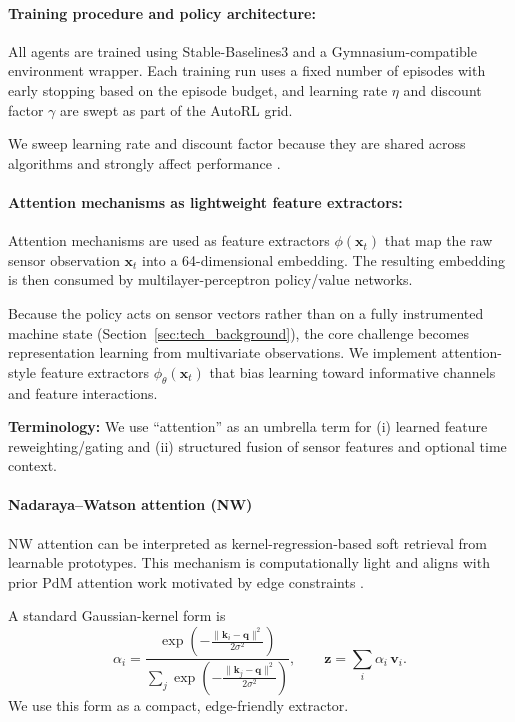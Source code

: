 \documentclass[sn-basic]{sn-jnl} %
\begin{document}
\paragraph{Training procedure and policy architecture:}
All agents are trained using Stable-Baselines3 and a Gymnasium-compatible environment wrapper. Each training run uses a fixed number of episodes with early stopping based on the episode budget, and learning rate $\eta$ and discount factor $\gamma$ are swept as part of the AutoRL grid.

We sweep learning rate and discount factor because they are shared across algorithms and strongly affect performance \cite{Henderson2019, Shala2022AutoRL, Eimer2023}.


\paragraph{Attention mechanisms as lightweight feature extractors:}
\label{sec:attention}

Attention mechanisms are used as feature extractors $\phi(\mathbf{x}_t)$ that map the raw sensor observation $\mathbf{x}_t$ into a 64-dimensional embedding. The resulting embedding is then consumed by multilayer-perceptron policy/value networks.

Because the policy acts on sensor vectors rather than on a fully instrumented machine state (Section~\ref{sec:tech_background}), the core challenge becomes representation learning from multivariate observations. We implement attention-style feature extractors $\phi_\theta(\mathbf{x}_t)$ that bias learning toward informative channels and feature interactions.

\textbf{Terminology:} We use ``attention'' as an umbrella term for (i) learned feature reweighting/gating and (ii) structured fusion of sensor features and optional time context.

\paragraph{Nadaraya--Watson attention (NW)}
NW attention can be interpreted as kernel-regression-based soft retrieval from learnable prototypes. This mechanism is computationally light and aligns with prior PdM attention work motivated by edge constraints \cite{Siraskar2024}.

A standard Gaussian-kernel form is
\begin{equation}
\alpha_i = \frac{\exp\left(-\tfrac{\lVert \mathbf{k}_i-\mathbf{q}\rVert^2}{2\sigma^2}\right)}{\sum_j \exp\left(-\tfrac{\lVert \mathbf{k}_j-\mathbf{q}\rVert^2}{2\sigma^2}\right)},
\qquad \mathbf{z}=\sum_i\alpha_i\,\mathbf{v}_i.
\end{equation}
We use this form as a compact, edge-friendly extractor.
\end{document}
